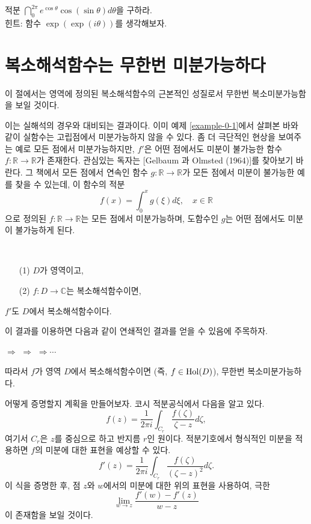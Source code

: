 \begin{salt_exercise} \label{ex-3-28}
적분 $\dint_0^{2\pi} e^{\cos \theta} \cos(\sin\theta)d\theta$을 구하라.\\[1ex]
힌트: 함수 $\exp(\exp(i\theta))$를 생각해보자.
\end{salt_exercise}

\section{복소해석함수는 무한번 미분가능하다}

이 절에서는 영역에 정의된 복소해석함수의 근본적인 성질로서 
무한번 복소미분가능함을 보일 것이다.

이는 실해석의 경우와 대비되는 결과이다.
이미 예제 \ref{example-0-1}에서 살펴본 바와 같이
실함수는 고립점에서 미분가능하지 않을 수 있다.
좀 더 극단적인 현상을 보여주는 예로 
모든 점에서 미분가능하지만, $f'$은 어떤 점에서도 미분이 불가능한 
함수 $f:\mathbb R\to \mathbb R$가 존재한다.
관심있는 독자는 [Gelbaum 과 Olmsted (1964)]를 %
 찾아보기 바란다.
그 책에서 모든 점에서 연속인 함수 $g:\mathbb R\to \mathbb R$가 
모든 점에서 미분이 불가능한 예를 찾을 수 있는데,
이 함수의 적분
\[
f(x) = \int_0^x g(\xi)d\xi, \quad x\in \mathbb R
\]
으로 정의된 $f:\mathbb R\to \mathbb R$는 모든 점에서 미분가능하며,
도함수인 $g$는 어떤 점에서도 미분이 불가능하게 된다.

\begin{salt_corollary} \label{coro-3-6}
\
\begin{itemize}
\item[(1)] $D$가 영역이고,
\item[(2)] $f:D\to\mathbb C$는 복소해석함수이면,
\end{itemize}
$f'$도 $D$에서 복소해석함수이다.
\end{salt_corollary}

이 결과를 이용하면 다음과 같이 연쇄적인 결과를 얻을 수 있음에 주목하자.

\begin{center}
 $\Rightarrow$ 
$\Rightarrow$
$\Rightarrow\cdots$
\end{center}

따라서 $f$가 영역  $D$에서 복소해석함수이면 (즉, $f\in \mathop{\mathrm{Hol}}(D)$),
무한번 복소미분가능하다.

어떻게 증명할지 계획을 만들어보자.
코시 적분공식에서 다음을 알고 있다.
\[
f(z) = \dfrac1{2\pi i} \int_{C_r} \dfrac{f(\zeta)}{\zeta - z} d\zeta,
\]
여기서 $C_r$은 $z$를 중심으로 하고 반지름 $r$인 원이다.
적분기호에서 형식적인 미분을 적용하면
$f$의 미분에 대한 표현을 예상할 수 있다.
\[
f'(z) = \dfrac1{2\pi i} \int_{C_r} \dfrac{f(\zeta)}{(\zeta - z)^2} d\zeta.
\]
이 식을 증명한 후, 점 $z$와 $w$에서의 미분에 대한 위의 표현을 사용하여, 극한
\[
\lim_{w\to z}\dfrac{f'(w)-f'(z)}{w-z}
\]
이 존재함을 보일 것이다.

